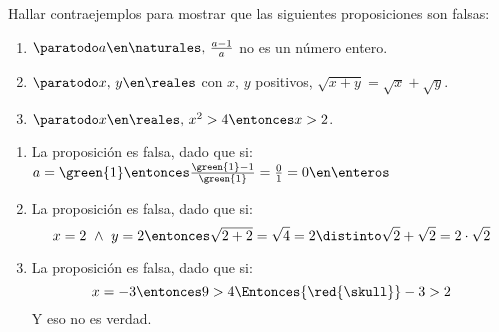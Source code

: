 \begin{enunciado}{\ejercicio}
  Hallar contraejemplos para mostrar que las siguientes proposiciones son falsas:
  \begin{enumerate}[label=\roman*)]
    \item $\paratodo a \en \naturales,\, \frac{a - 1}{a}$ no es un número entero.
    \item $\paratodo x,\, y \en \reales$ con $x,\, y$ positivos, $\sqrt{x + y} = \sqrt{x} + \sqrt{y}$.
    \item $\paratodo x \en \reales,\, x^2 > 4 \entonces x > 2$.
  \end{enumerate}
\end{enunciado}

\begin{enumerate}[label=\roman*)]
  \item La proposición es falsa, dado que si:
        $a = \green{1}
          \entonces
          \frac{\green{1} - 1}{\green{1}} =
          \frac{0}{1} =
          0 \en \enteros$

  \item La proposición es falsa, dado que si:
        $$
          x = 2
          ~ \land ~
          y = 2
          \entonces
          \sqrt{2 + 2} = \sqrt{4} = 2 \distinto \sqrt{2} + \sqrt{2} = 2 \cdot \sqrt{2}
        $$

  \item La  proposición es falsa, dado que si:
        $$
          x = -3 \entonces 9 > 4 \Entonces{\red{\skull}} -3 > 2
        $$
        Y eso no es verdad.
\end{enumerate}

\begin{aportes}
  \item {}
\end{aportes}
